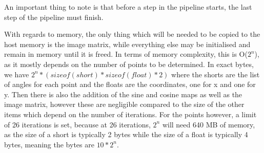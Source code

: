 An important thing to note is that before a step in the pipeline starts, the last step of the pipeline must finish.

With regards to memory, the only thing which will be needed to be copied to the host memory is the image matrix, while everything else may be initialised and remain in memory until it is freed. In terms of memory complexity, this is O($2^n$), as it mostly depends on the number of points to be determined. In exact bytes, we have $2^n * (sizeof(short) * sizeof(float) * 2)$ where the shorts are the list of angles for each point and the floats are the coordinates, one for x and one for y. Then there is also the addition of the sine and cosine maps as well as the image matrix, however these are negligible compared to the size of the other items which depend on the number of iterations. For the points however, a limit of 26 iterations is set, because at 26 iterations, $2^n$ will need 640 MB of memory, as the size of a short is typically 2 bytes while the size of a float is typically 4 bytes, meaning the bytes are $10*2^n$.
